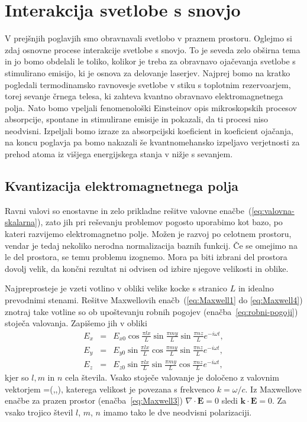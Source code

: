 \chapter{Interakcija svetlobe s snovjo}

V prejšnjih poglavjih smo obravnavali svetlobo v praznem prostoru. Oglejmo si
zdaj osnovne procese interakcije svetlobe s snovjo. To je seveda zelo
obširna tema in jo bomo obdelali le toliko, kolikor je treba za
obravnavo ojačevanja svetlobe s stimulirano emisijo, ki je osnova za
delovanje laserjev. Najprej bomo na kratko pogledali termodinamsko ravnovesje 
svetlobe v stiku s toplotnim rezervoarjem, torej sevanje črnega telesa, ki 
zahteva kvantno obravnavo elektromagnetnega polja. Nato bomo vpeljali fenomenološki
Einsteinov opis mikroskopskih procesov absorpcije, spontane in stimulirane
emisije in pokazali, da ti procesi niso neodvisni. Izpeljali bomo
izraze za absorpcijski koeficient in koeficient ojačanja, na koncu poglavja
pa bomo nakazali še kvantnomehansko izpeljavo verjetnosti za prehod
atoma iz višjega energijskega stanja v nižje s sevanjem.

\section{Kvantizacija elektromagnetnega polja}

Ravni valovi so enostavne in zelo prikladne rešitve valovne 
enačbe~(\ref{eq:valovna-skalarna}), zato jih pri reševanju problemov pogosto uporabimo kot 
bazo, po kateri razvijemo elektromagnetno polje. Možen je razvoj
po celotnem prostoru, vendar je tedaj nekoliko nerodna normalizacija baznih
funkcij. Če se omejimo na le del prostora, se temu problemu izognemo. Mora pa biti 
izbrani del prostora dovolj velik, da končni rezultat ni odvisen od izbire 
njegove velikosti in oblike.

Najpreprosteje je vzeti votlino v obliki velike kocke s stranico
$L$ in idealno prevodnimi stenami. Rešitve Maxwellovih enačb~(\ref{eq:Maxwell1} do \ref{eq:Maxwell4}) 
znotraj take votline so ob upoštevanju robnih pogojev (enačba~\ref{eq:robni-pogoji}) 
stoječa valovanja. Zapišemo jih v obliki
\begin{eqnarray}
E_{x} & = & E_{x0}\cos\frac{\pi lx}{L}\sin\frac{\pi my}{L}\sin\frac{\pi nz}{L}e^{-i\omega t},\nonumber \\
E_{y} & = & E_{y0}\sin\frac{\pi lx}{L}\cos\frac{\pi my}{L}\sin\frac{\pi nz}{L}e^{-i\omega t},\nonumber \\
E_{z} & = & E_{z0}\sin\frac{\pi lx}{L}\sin\frac{\pi my}{L}\cos\frac{\pi nz}{L}e^{-i\omega t},
\label{eq:stojece_votlina}
\end{eqnarray}
kjer so $l,m$ in $n$ cela števila. Vsako stoječe valovanje je določeno z valovnim 
vektorjem
\beq
{}=\left(,,\right),
\eeq 
katerega velikost je povezana s frekvenco $k = \omega/c$.
Iz Maxwellove enačbe za prazen prostor (enačba~\ref{eq:Maxwell3}) 
$\nabla\cdot\mathbf{E}=0$ sledi $\mathbf{k}\cdot\mathbf{E}=0$. 
Za vsako trojico števil $l$, $m$, $n$ imamo tako le dve
neodvisni polarizaciji.


